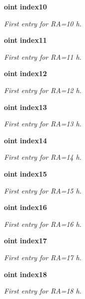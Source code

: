 \begin{CompactItemize}
{\bf oint} {\bf index10}
\begin{CompactList}\small\item\em First entry for RA=10 h. \item\end{CompactList}\item 
{\bf oint} {\bf index11}
\begin{CompactList}\small\item\em First entry for RA=11 h. \item\end{CompactList}\item 
{\bf oint} {\bf index12}
\begin{CompactList}\small\item\em First entry for RA=12 h. \item\end{CompactList}\item 
{\bf oint} {\bf index13}
\begin{CompactList}\small\item\em First entry for RA=13 h. \item\end{CompactList}\item 
{\bf oint} {\bf index14}
\begin{CompactList}\small\item\em First entry for RA=14 h. \item\end{CompactList}\item 
{\bf oint} {\bf index15}
\begin{CompactList}\small\item\em First entry for RA=15 h. \item\end{CompactList}\item 
{\bf oint} {\bf index16}
\begin{CompactList}\small\item\em First entry for RA=16 h. \item\end{CompactList}\item 
{\bf oint} {\bf index17}
\begin{CompactList}\small\item\em First entry for RA=17 h. \item\end{CompactList}\item 
{\bf oint} {\bf index18}
\begin{CompactList}\small\item\em First entry for RA=18 h. \item\end{CompactList}\item 

\end{CompactItemize}
